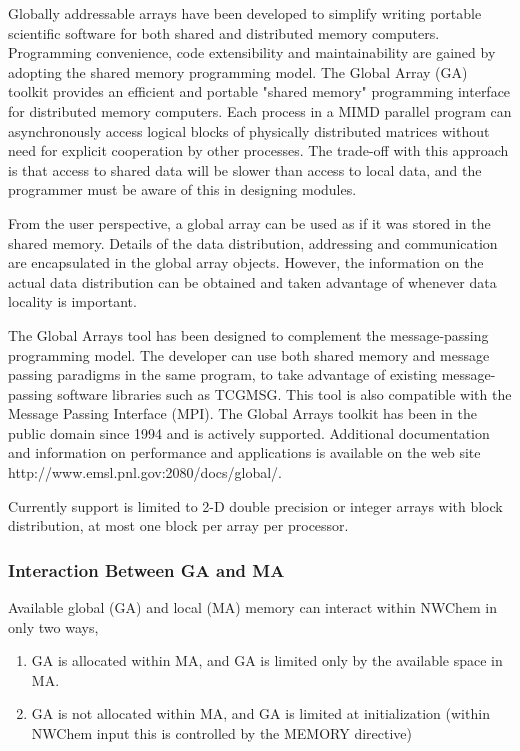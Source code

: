 \label{sec:ga}

%

Globally addressable arrays have been developed to simplify writing
portable scientific software for both shared and distributed memory
computers.  Programming convenience, code extensibility and
maintainability are gained by adopting the shared memory programming
model.  The Global Array (GA) toolkit provides an efficient and portable 
"shared memory" programming interface for distributed memory computers.
Each process in a MIMD parallel program can asynchronously access
logical blocks of physically distributed matrices without need for
explicit cooperation by other processes. 
The trade-off with this approach is that
access to shared data will be slower than access
to local data, and the programmer must be aware of this in designing modules.

From the user perspective, a global array can be used as if it was stored
in the shared memory. Details of the data distribution, addressing and
communication are encapsulated in the global array objects. However,
the information on the actual data distribution can be obtained and
taken advantage of whenever data locality is important.

The Global Arrays tool has been designed to complement the message-passing 
programming model.  The developer can use both shared memory and message
passing paradigms in the same program, to take advantage of existing
message-passing software libraries such as TCGMSG.  This tool is also 
compatible with the Message Passing Interface (MPI).  The Global Arrays toolkit
has been in the public domain since 1994 and is actively supported.  Additional
documentation and information on performance and applications is available
on the web site http://www.emsl.pnl.gov:2080/docs/global/.

Currently support is limited to 2-D double precision or integer arrays
with block distribution, at most one block per array per processor.

\subsubsection{Interaction Between GA and MA}

Available global (GA)
and local (MA) memory can interact within NWChem in only two ways,

\begin{enumerate}
\item GA is allocated within MA, and GA is limited only by the available
    space in MA.

\item GA is not allocated within MA, and GA is limited at initialization
    (within NWChem input this is controlled by the MEMORY directive)
\end{enumerate}

